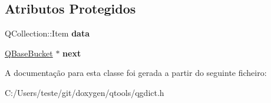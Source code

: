 \subsection*{Atributos Protegidos}
\begin{DoxyCompactItemize}
\item 
\hypertarget{class_q_base_bucket_aaa0f0dbf0a3f82ea3bfdea9bca2041fb}{Q\-Collection\-::\-Item {\bfseries data}}\label{class_q_base_bucket_aaa0f0dbf0a3f82ea3bfdea9bca2041fb}

\item 
\hypertarget{class_q_base_bucket_aa2b83153f2a8bfbb248f7c6dfa783d9a}{\hyperlink{class_q_base_bucket}{Q\-Base\-Bucket} $\ast$ {\bfseries next}}\label{class_q_base_bucket_aa2b83153f2a8bfbb248f7c6dfa783d9a}

\end{DoxyCompactItemize}


A documentação para esta classe foi gerada a partir do seguinte ficheiro\-:\begin{DoxyCompactItemize}
\item 
C\-:/\-Users/teste/git/doxygen/qtools/qgdict.\-h\end{DoxyCompactItemize}
